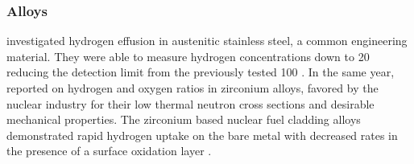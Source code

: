 \documentclass[../../../main.tex]{subfiles}%
\begin{document}
%
    \subsubsection{Alloys}%
    \label{sec:chapter-1:motivation:alloys}%
    \citeauthor*{Beyer_2011} investigated hydrogen effusion in austenitic stainless steel, a common engineering material.
    They were able to measure hydrogen concentrations down to \SI{20}{\partpermillion} reducing the detection limit from the previously tested \SI{100}{\partpermillion} \cite{Beyer_2011}.
    In the same year, \citeauthor*{Grosse_2011} reported on hydrogen and oxygen ratios in zirconium alloys, favored by the nuclear industry for their low thermal neutron cross sections and desirable mechanical properties.
    The zirconium based nuclear fuel cladding alloys demonstrated rapid hydrogen uptake on the bare metal with decreased rates in the presence of a surface oxidation layer \cite{Grosse_2011}.
\end{document}
